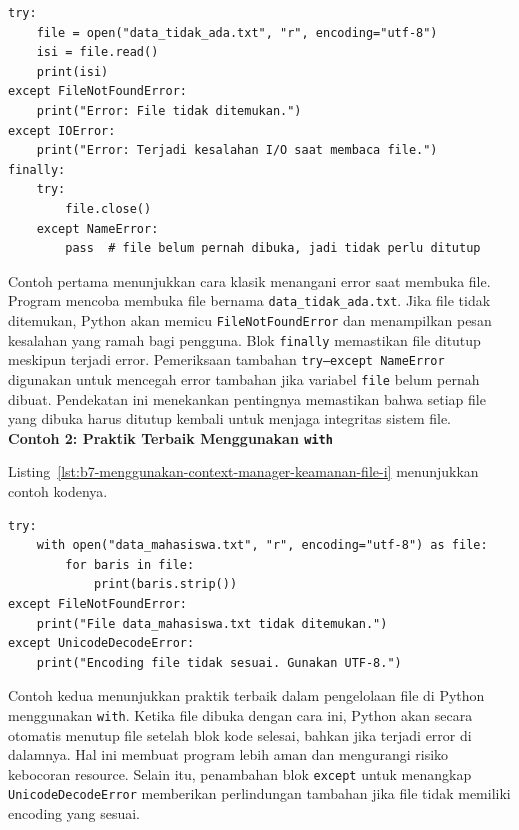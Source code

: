 \begin{lstlisting}[style=PythonStyle, caption={Penanganan error dasar saat membuka file}, label={lst:b7-penanganan-error-dasar-saat-membuka-file}]
try:
    file = open("data_tidak_ada.txt", "r", encoding="utf-8")
    isi = file.read()
    print(isi)
except FileNotFoundError:
    print("Error: File tidak ditemukan.")
except IOError:
    print("Error: Terjadi kesalahan I/O saat membaca file.")
finally:
    try:
        file.close()
    except NameError:
        pass  # file belum pernah dibuka, jadi tidak perlu ditutup
\end{lstlisting}

Contoh pertama menunjukkan cara klasik menangani error saat membuka file.  
Program mencoba membuka file bernama \texttt{data\_tidak\_ada.txt}. Jika file tidak ditemukan, Python akan memicu \texttt{FileNotFoundError} dan menampilkan pesan kesalahan yang ramah bagi pengguna.  
Blok \texttt{finally} memastikan file ditutup meskipun terjadi error.  
Pemeriksaan tambahan \texttt{try--except NameError} digunakan untuk mencegah error tambahan jika variabel \texttt{file} belum pernah dibuat.  
Pendekatan ini menekankan pentingnya memastikan bahwa setiap file yang dibuka harus ditutup kembali untuk menjaga integritas sistem file.\\

\noindent\textbf{Contoh 2: Praktik Terbaik Menggunakan \texttt{with}}

Listing~\ref{lst:b7-menggunakan-context-manager-keamanan-file-i} menunjukkan contoh kodenya.

\begin{lstlisting}[style=PythonStyle, caption={Menggunakan context manager untuk keamanan file I/O}, label={lst:b7-menggunakan-context-manager-keamanan-file-i}]
try:
    with open("data_mahasiswa.txt", "r", encoding="utf-8") as file:
        for baris in file:
            print(baris.strip())
except FileNotFoundError:
    print("File data_mahasiswa.txt tidak ditemukan.")
except UnicodeDecodeError:
    print("Encoding file tidak sesuai. Gunakan UTF-8.")
\end{lstlisting}

Contoh kedua menunjukkan praktik terbaik dalam pengelolaan file di Python menggunakan \texttt{with}.  
Ketika file dibuka dengan cara ini, Python akan secara otomatis menutup file setelah blok kode selesai, bahkan jika terjadi error di dalamnya.  
Hal ini membuat program lebih aman dan mengurangi risiko kebocoran resource.  
Selain itu, penambahan blok \texttt{except} untuk menangkap \texttt{UnicodeDecodeError} memberikan perlindungan tambahan jika file tidak memiliki encoding yang sesuai.

